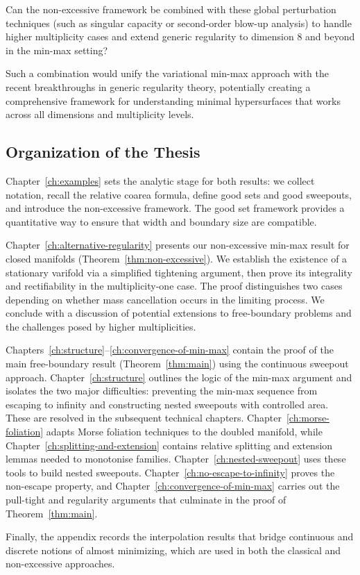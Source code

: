 \begin{question}
Can the non-excessive framework be combined with these global perturbation techniques (such as
singular capacity or second-order blow-up analysis) to handle higher multiplicity cases and extend
generic regularity to dimension $8$ and beyond in the min-max setting?
\end{question}

Such a combination would unify the variational min-max approach with the recent breakthroughs in
generic regularity theory, potentially creating a comprehensive framework for understanding minimal
hypersurfaces that works across all dimensions and multiplicity levels.

\subsection{Organization of the Thesis}

Chapter~\ref{ch:examples} sets the analytic stage for both results: we collect notation, recall
the relative coarea formula, define good sets and good sweepouts, and introduce the non-excessive
framework. The good set framework provides a quantitative way to ensure that width and boundary
size are compatible.

Chapter~\ref{ch:alternative-regularity} presents our non-excessive min-max result for closed manifolds
(Theorem~\ref{thm:non-excessive}). We establish the existence of a stationary varifold via a
simplified tightening argument, then prove its integrality and rectifiability in the multiplicity-one
case. The proof distinguishes two cases depending on whether mass cancellation occurs in the limiting
process. We conclude with a discussion of potential extensions to free-boundary problems and the
challenges posed by higher multiplicities.

Chapters~\ref{ch:structure}--\ref{ch:convergence-of-min-max} contain the proof of the main
free-boundary result (Theorem~\ref{thm:main}) using the continuous sweepout approach.
Chapter~\ref{ch:structure} outlines the logic of the min-max argument and isolates the two major
difficulties: preventing the min-max sequence from escaping to infinity and constructing nested
sweepouts with controlled area. These are resolved in the subsequent technical chapters.
Chapter~\ref{ch:morse-foliation} adapts Morse foliation techniques to the doubled manifold, while
Chapter~\ref{ch:splitting-and-extension} contains relative splitting and extension lemmas needed
to monotonise families. Chapter~\ref{ch:nested-sweepout} uses these tools to build nested sweepouts.
Chapter~\ref{ch:no-escape-to-infinity} proves the non-escape property, and
Chapter~\ref{ch:convergence-of-min-max} carries out the pull-tight and regularity arguments that
culminate in the proof of Theorem~\ref{thm:main}.

Finally, the appendix records the interpolation results that bridge continuous and discrete notions
of almost minimizing, which are used in both the classical and non-excessive approaches.
